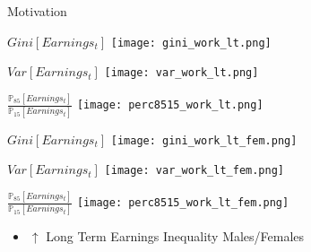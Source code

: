 \documentclass{beamer}
\begin{document}
\begin{frame}{Motivation}
\begin{minipage}[b]{0.32\textwidth}{$Gini[Earnings_t]$}
\centering
\texttt{[image: gini\_work\_lt.png]}
\end{minipage}
\begin{minipage}[b]{0.32\textwidth}{$Var[Earnings_t]$}
\centering
\texttt{[image: var\_work\_lt.png]}
\end{minipage}
\begin{minipage}[b]{0.32\textwidth}{$\frac{\mathbb{P}_{85}[Earnings_t]}{\mathbb{P}_{15}[Earnings_t]}$}
\centering
\texttt{[image: perc8515\_work\_lt.png]}
\end{minipage}
\begin{minipage}[b]{0.32\textwidth}{$Gini[Earnings_t]$}
\centering
\texttt{[image: gini\_work\_lt\_fem.png]}
\end{minipage}
\begin{minipage}[b]{0.32\textwidth}{$Var[Earnings_t]$}
\centering
\texttt{[image: var\_work\_lt\_fem.png]}
\end{minipage}
\begin{minipage}[b]{0.32\textwidth}{$\frac{\mathbb{P}_{85}[Earnings_t]}{\mathbb{P}_{15}[Earnings_t]}$}
\centering
\texttt{[image: perc8515\_work\_lt\_fem.png]}
\end{minipage}
\begin{itemize}
\setlength{\itemsep}{0.7 cm}
\item $\uparrow$ Long Term Earnings Inequality Males/Females
\end{itemize}
\hyperlink{Motivation_1}{}
\end{frame}
\end{document}
